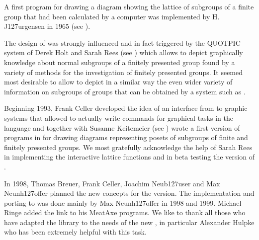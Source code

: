 
A first program for drawing a diagram showing the lattice of subgroups
of  a finite  group  that  had  been   calculated by  a  computer  was
implemented by H. J\accent127urgensen in 1965 (see \cite{FJ65}).

The  design of {\XGAP} was strongly  influenced and  in fact triggered by
the  QUOTPIC system of  Derek Holt  and  Sarah Rees (see \cite{HR91})
%
which allows to depict graphically knowledge about normal subgroups of
a finitely presented group found by a variety of methods for the
investigation of finitely presented groups.  It seemed most desirable
to allow to depict in a similar way the even wider variety of
information on subgroups of groups that can be obtained by a system
such as {\GAP}.

Beginning 1993,  Frank Celler developed the  idea of an interface from
{\GAP}   to graphic systems that  allowed  to actually write commands for
graphical   tasks  in  the {\GAP}  language   and  together with  Susanne
Keitemeier  (see \cite{SK95}) wrote a first version
of   programs in {\XGAP}  for   drawing diagrams  representing posets  of
subgroups of finite and finitely presented groups.  We most gratefully
acknowledge  the  help of  Sarah Rees in  implementing the interactive
lattice functions and in beta testing the {} version of {\XGAP}.

In 1998, Thomas Breuer, Frank Celler, Joachim Neub\accent127user and Max
Neunh\accent127offer planned the new concepts for the {}
version. The implementation and porting to {} was done mainly by Max
Neunh\accent127offer in 1998 and 1999. Michael Ringe added the link to his
MeatAxe programs. We like to thank all those who have adapted the {\GAP} 
library to the needs of the new {\XGAP}, in particular Alexander Hulpke who 
has been extremely helpful with this task.

